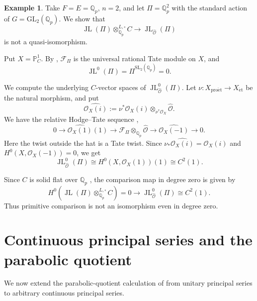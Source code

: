\documentclass[11pt]{article}
\theoremstyle{definition}
\newtheorem{example}[theorem]{Example}
\newcommand{\Qp}{\mathbb Q_p}
\newcommand{\cO}{\mathcal O}
\newcommand{\cF}{\mathcal F}
\newcommand{\Pone}{\mathbb P^1}
\newcommand{\proet}{\mathrm{pro\acute et}}
\newcommand{\et}{\mathrm{\acute et}}
\newcommand{\JL}{\operatorname{JL}}
\begin{document}
\begin{example}
\label{ex:standard-representation-primitive-failure}
Take \(F=E=\Qp\), \(n=2\), and let \(\Pi=\Qp^2\) with the
standard action of \(G=\mathrm{GL}_2(\Qp)\). We show that
\[
 \JL(\Pi)\otimes_{\Qp}^{L,\square}C
 \longrightarrow \JL_{\widehat{\mathscr O}}(\Pi)
\]
is not a quasi-isomorphism.

Put \(X=\Pone_C\). By \cite[Example~1.1.2]{ALM},
\(\cF_\Pi\) is the universal rational Tate module on \(X\), and
\[
 \JL^0(\Pi)=\Pi^{\mathrm{SL}_2(\Qp)}=0.
\]

We compute the underlying \(C\)-vector spaces of $\JL^0_{\widehat{\mathscr{O}}}(\Pi)$.
Let \(\nu:X_{\proet}\to X_{\et}\) be the natural morphism, and put
\[
 \widehat{\cO_X(i)}
 :=\nu^*\cO_X(i)\otimes_{\nu^*\cO_X}\widehat{\mathscr O}.
\]
We have the relative Hodge--Tate sequence \cite[Proposition~5.1.6(iii) and \S6.1]{ScholzeWeinsteinModuli},
\[
 0\longrightarrow\widehat{\cO_X(1)}(1)
 \longrightarrow\cF_\Pi\otimes_{\Qp}\widehat{\mathscr O}
 \longrightarrow\widehat{\cO_X(-1)}
 \longrightarrow0.
\]
Here the twist outside the hat is a Tate twist.
Since \(\nu_*\widehat{\cO_X(i)}=\cO_X(i)\) and
\(H^0(X,\cO_X(-1))=0\), we get
\[
 \JL_{\widehat{\mathscr O}}^0(\Pi)
 \cong H^0(X,\cO_X(1))(1)
 \cong C^2(1).
\]

Since \(C\) is solid flat over \(\Qp\)
\cite[\S2.3.1]{DRC}, the comparison map in degree zero is given by
\[
 H^0\!\left(\JL(\Pi)\otimes_{\Qp}^{L,\square}C\right)
 =0
 \longrightarrow
 \JL_{\widehat{\mathscr O}}^0(\Pi)
 \cong C^2(1).
\]
Thus primitive comparison is not an isomorphism even in
degree zero.
\end{example}

\section{Continuous principal series and the parabolic quotient}
\label{sec:continuous-parabolic-induction}
We now extend the parabolic-quotient calculation of \cite[\S5.2--5.3]{JLH}
from unitary principal series to arbitrary continuous principal series. 
\end{document}
